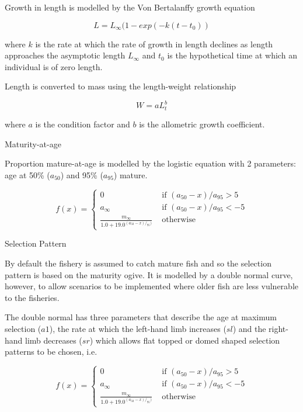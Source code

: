 \documentclass[preprint,review,12pt]{elsarticle}
\begin{document}
Growth in length is modelled by the Von Bertalanffy growth equation \cite{vonbert1957quantitative}

\begin{equation} L = L_\infty(1 - exp(-k(t-t_0)) \end{equation}
         
where $k$ is the rate at which the rate of growth in length declines as length approaches the asymptotic length  $L_\infty$ and $t_{0}$ is the hypothetical time at which an individual is of zero length.

Length is converted to mass using the length-weight relationship 
    
\begin{equation} W = aL_t^b \end{equation}

\noindent where $a$ is the condition factor and $b$ is the allometric growth coefficient.


Maturity-at-age

Proportion mature-at-age is modelled by the logistic equation with 2 parameters: age at 50\% ($a_{50}$) and 95\% ($a_{95}$) mature.

\begin{equation}
f(x) = \left\{ \begin{array}{ll}
			0                                 &\mbox{ if $(a_{50}-x)/a_{95} >  5$} \\
			a_{\infty}                        &\mbox{ if $(a_{50}-x)/a_{95} < -5$} \\
			\frac{m_{\infty}}{1.0+19.0^{(a_{50}-x)/_{95})}} &\mbox{ otherwise}
		\end{array}
       \right.
\end{equation}

Selection Pattern

By default the fishery is assumed to catch mature fish and so the selection pattern is based on the maturity ogive. It is modelled by a double normal curve, however, to allow scenarios to be implemented where older fish are less vulnerable to the fisheries.    

The double normal has three parameters that describe the age at maximum selection ($a1$), the rate at which the left-hand  limb increases ($sl$) and the right-hand limb decreases ($sr$) which allows flat topped or domed shaped selection patterns to be chosen, i.e.
         
\begin{equation}
f(x) = \left\{ \begin{array}{ll}
			0                                 &\mbox{ if $(a_{50}-x)/a_{95} >  5$} \\
			a_\infty                        &\mbox{ if $(a_{50}-x)/a_{95} < -5$} \\
			\frac{m_\infty}{1.0+19.0^{(a_{50}-x)/_{95})}} &\mbox{ otherwise}
		\end{array}
       \right.
\end{equation}
\end{document}
